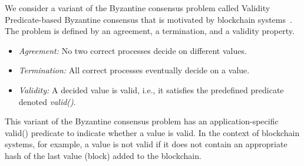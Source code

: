 We consider a variant of the Byzantine consensus problem called Validity Predicate-based Byzantine consensus that is motivated by blockchain systems~\cite{GLR17:red-belly-bc}. The problem is defined by an agreement, a termination, and a validity
property.

 \begin{itemize}
 \item \emph{Agreement:} No two correct processes decide on different values.
 \item \emph{Termination:} All correct processes eventually decide on a value.
 \item \emph{Validity:} A decided value is valid, i.e., it satisfies the predefined predicate denoted \emph{valid()}.
 \end{itemize}

This variant of the Byzantine consensus problem has an application-specific valid() predicate to indicate whether a value is valid. In the context of blockchain systems, for example, a value is not valid if it does not contain an appropriate hash of the last value (block) added to the blockchain.

